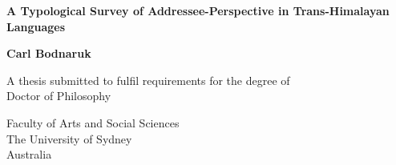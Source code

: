 \begin{titlepage}
    \begin{center}
        \vspace*{1cm}
            
        \huge
        \textbf{A Typological Survey of Addressee-Perspective in Trans-Himalayan Languages}
            
        \vspace{0.5cm}

            
        \vspace{1.5cm}
            
        \textbf{Carl Bodnaruk}
            
        \vfill
            
        A thesis submitted to fulfil requirements for the degree of \\
        Doctor of Philosophy
            
        \vspace{2cm}
            
        \Large
        Faculty of Arts and Social Sciences\\
        The University of Sydney\\
        Australia\\
            
    \end{center}
\end{titlepage}